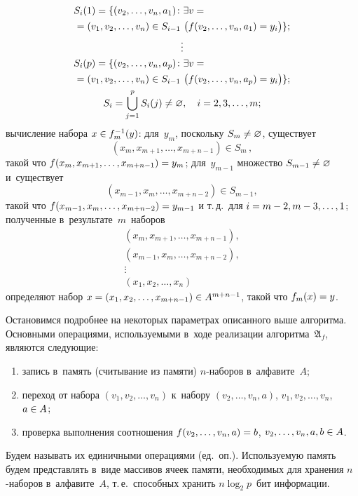 \begin{multicols}{2}
\noindent
\begin{gather*}
\hspace*{-30mm}S_i(1)=\{(v_2,\ldots,v_n,a_1)\colon\exists v={}\\
{}=(v_1,v_2,\ldots,v_n)\in S_{i-1}\  
\bigl(f(v_2,\ldots,v_n,a_1)=y_i\bigr)\};\\
\vdots\\
\hspace*{-30mm}S_i(p)=\{(v_2,\ldots,v_n,a_p)\colon\exists v={}\\
{}=(v_1,v_2,\ldots,v_n)\in S_{i-1}\  
\bigl(f(v_2,\ldots,v_n,a_p)=y_i\bigr)\};\\
S_i=\bigcup\limits_{j=1}^p S_i(j)\neq\varnothing,\quad i=2,3,\ldots,m;
\end{gather*}
вычисление набора $x\hm\in f_m^{-1}(y)$:
для~$y_m$, поскольку $S_m\hm\neq\varnothing$, существует
$$
\left(x_m,x_{m+1},\ldots,x_{m+n-1}\right)\in S_m\,,
$$
такой что $f(x_m,x_{m+1},\ldots,x_{m+n-1})\hm=y_m$;
для~$y_{m-1}$ множество $S_{m-1}\hm\neq\varnothing$ и~существует
$$
\left(x_{m-1},x_m,\ldots,x_{m+n-2}\right)\in S_{m-1},
$$
такой что $f(x_{m-1},x_m,\ldots,x_{m+n-2})\hm=y_{m-1}$
и т.\,д.\ для $i\hm=m-2,m-3,\ldots,1$;
полученные в~результате~$m$~наборов
\begin{gather*}
\left(x_m,x_{m+1},\ldots,x_{m+n-1}\right),\\
\left(x_{m-1},x_m,\ldots,x_{m+n-2}\right),\\
\vdots\\
\left(x_1,x_2,\ldots,x_n\right)
\end{gather*}
определяют набор $x\hm=(x_1,x_2,\ldots,x_{m+n-1})\hm\in A^{m+n-1}$, такой что 
$f_m(x)\hm=y$.

\smallskip

Остановимся подробнее на некоторых па\-ра\-мет\-рах описанного выше алгоритма.
Основными операциями, используемыми в~ходе реализации алгоритма~$\mathfrak{A}_f$, 
являются следующие:
\begin{enumerate}[(1)]
 \item запись в~память (считывание из памяти) $n$-на\-бо\-ров в~алфавите~$A$;
 \item переход от набора $(v_1,v_2,\ldots,v_n)$ к~набору 
$(v_2,\ldots,v_n,a)$, $v_1,v_2,\ldots,v_n$, $a\hm\in A$;
 \item проверка выполнения соотношения $f(v_2,\ldots,v_n,a)\hm=b$, 
$v_2,\ldots,v_n, a,b\hm\in A$.
\end{enumerate}
Будем называть их единичными операциями (ед.~оп.). Используемую память будем 
представлять в~виде массивов ячеек памяти, необходимых для хранения $n$-на\-бо\-ров 
в~алфавите~$A$, т.\,е.\ способных хранить $n\log_2 p$~бит информации.


\end{multicols}
